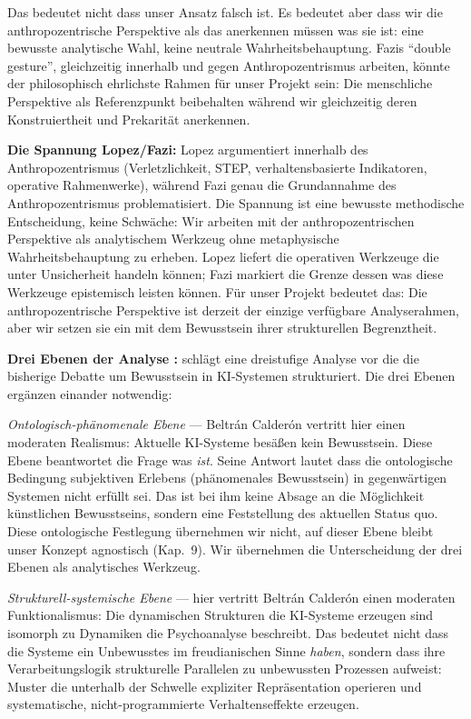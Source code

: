 \documentclass[acmlarge, noacm]{acmart}
\begin{document}
Das bedeutet nicht dass unser Ansatz falsch ist. Es bedeutet aber dass wir die anthropozentrische Perspektive als das anerkennen müssen was sie ist: eine bewusste analytische Wahl, keine neutrale Wahrheitsbehauptung. Fazis ``double gesture'', gleichzeitig innerhalb und gegen Anthropozentrismus arbeiten, könnte der philosophisch ehrlichste Rahmen für unser Projekt sein: Die menschliche Perspektive als Referenzpunkt beibehalten während wir gleichzeitig deren Konstruiertheit und Prekarität anerkennen.

\textbf{Die Spannung Lopez/Fazi:} Lopez argumentiert innerhalb des Anthropozentrismus (Verletzlichkeit, STEP, verhaltensbasierte Indikatoren, operative Rahmenwerke), während Fazi genau die Grundannahme des Anthropozentrismus problematisiert. Die Spannung ist eine bewusste methodische Entscheidung, keine Schwäche: Wir arbeiten mit der anthropozentrischen Perspektive als analytischem Werkzeug ohne metaphysische Wahrheitsbehauptung zu erheben. Lopez liefert die operativen Werkzeuge die unter Unsicherheit handeln können; Fazi markiert die Grenze dessen was diese Werkzeuge epistemisch leisten können. Für unser Projekt bedeutet das: Die anthropozentrische Perspektive ist derzeit der einzige verfügbare Analyserahmen, aber wir setzen sie ein mit dem Bewusstsein ihrer strukturellen Begrenztheit.

\textbf{Drei Ebenen der Analyse \cite{beltran2026}:} \citet{beltran2026} schlägt eine dreistufige Analyse vor die die bisherige Debatte um Bewusstsein in KI-Systemen strukturiert. Die drei Ebenen ergänzen einander notwendig:

\textit{Ontologisch-phänomenale Ebene} --- Beltrán Calderón vertritt hier einen moderaten Realismus: Aktuelle KI-Systeme besäßen kein Bewusstsein. Diese Ebene beantwortet die Frage was \textit{ist}. Seine Antwort lautet dass die ontologische Bedingung subjektiven Erlebens (phänomenales Bewusstsein) in gegenwärtigen Systemen nicht erfüllt sei. Das ist bei ihm keine Absage an die Möglichkeit künstlichen Bewusstseins, sondern eine Feststellung des aktuellen Status quo. Diese ontologische Festlegung übernehmen wir nicht, auf dieser Ebene bleibt unser Konzept agnostisch (Kap.~9). Wir übernehmen die Unterscheidung der drei Ebenen als analytisches Werkzeug.

\textit{Strukturell-systemische Ebene} --- hier vertritt Beltrán Calderón einen moderaten Funktionalismus: Die dynamischen Strukturen die KI-Systeme erzeugen sind isomorph zu Dynamiken die Psychoanalyse beschreibt. Das bedeutet nicht dass die Systeme ein Unbewusstes im freudianischen Sinne \textit{haben}, sondern dass ihre Verarbeitungslogik strukturelle Parallelen zu unbewussten Prozessen aufweist: Muster die unterhalb der Schwelle expliziter Repräsentation operieren und systematische, nicht-programmierte Verhaltenseffekte erzeugen.
\end{document}

